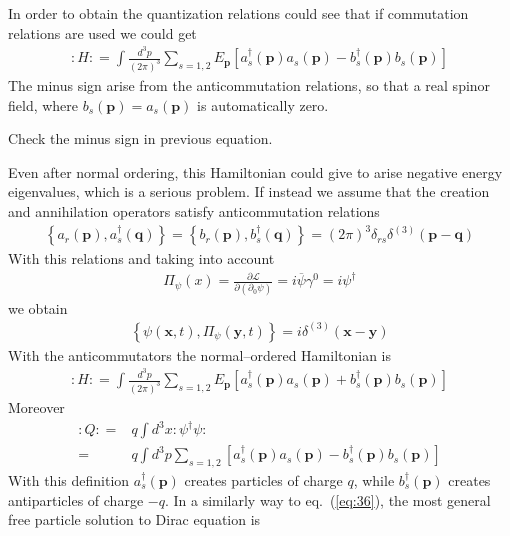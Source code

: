 In order to obtain the quantization relations could see that if commutation relations are used we could get
\begin{align}
  \colon\!H\colon=\int\frac{d^3p}{(2\pi)^3}\sum_{s=1,2}E_{\mathbf{p}}\left[a^\dagger_s(\mathbf{p})a_s(\mathbf{p})-b^\dagger_s(\mathbf{p})b_s(\mathbf{p})\right]
\end{align}
The minus sign arise from the anticommutation relations, so that a real spinor field, where $b_s(\mathbf{p})=a_s(\mathbf{p})$ is automatically zero.
\begin{inprogress}
  Check the minus sign in previous equation.
\end{inprogress}
Even after normal ordering, this Hamiltonian could give to arise negative energy eigenvalues, which is a serious problem. If instead we assume that the creation and annihilation operators satisfy anticommutation relations
\begin{align}
  \left\{a_r(\mathbf{p}),a_s^\dagger(\mathbf{q})\right\}=\left\{b_r(\mathbf{p}),b_s^\dagger(\mathbf{q})\right\}=(2\pi)^3\delta_{r s}\delta^{(3)}(\mathbf{p}-\mathbf{q})
\end{align}
With this relations and taking into account
\begin{align}
  \Pi_\psi(x)=\frac{\partial\mathcal{L}}{\partial(\partial_0\psi)}=i\overline{\psi}\gamma^0=i \psi^\dagger 
\end{align}
we obtain
\begin{align}
  \left\{\psi(\mathbf{x},t),\Pi_\psi(\mathbf{y},t)\right\}=i \delta^{(3)}(\mathbf{x}-\mathbf{y}) 
\end{align}
With the anticommutators the normal--ordered Hamiltonian is
\begin{align}
    \colon\!H\colon=\int\frac{d^3p}{(2\pi)^3}\sum_{s=1,2}E_{\mathbf{p}}\left[a^\dagger_s(\mathbf{p})a_s(\mathbf{p})+b^\dagger_s(\mathbf{p})b_s(\mathbf{p})\right]
\end{align}
Moreover
\begin{align}
    \colon\!Q\colon=&q\int d^3x \colon\!\psi^\dagger\psi\colon\nonumber\\
    =&   q \int d^3p\sum_{s=1,2}\left[a^\dagger_s(\mathbf{p})a_s(\mathbf{p})-b^\dagger_s(\mathbf{p})b_s(\mathbf{p})\right]
\end{align}
With this definition $a^\dagger_s(\mathbf{p})$ creates particles of charge $q$, while $b^\dagger_s(\mathbf{p})$ creates antiparticles of charge $-q$.
In a similarly way to eq.~(\ref{eq:36}), the most general free particle solution to Dirac equation is
